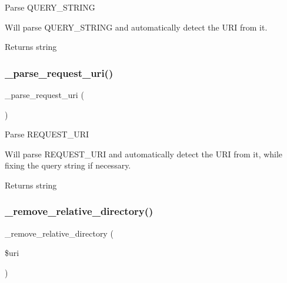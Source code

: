 Parse Q\+U\+E\+R\+Y\+\_\+\+S\+T\+R\+I\+NG

Will parse Q\+U\+E\+R\+Y\+\_\+\+S\+T\+R\+I\+NG and automatically detect the U\+RI from it.

\begin{DoxyReturn}{Returns}
string 
\end{DoxyReturn}
\mbox{\label{class_c_i___u_r_i_ae2e75a6f6657df51c7b6de926979af29}} 
\subsubsection{\texorpdfstring{\+\_\+parse\+\_\+request\+\_\+uri()}{\_parse\_request\_uri()}}
{\footnotesize\ttfamily \+\_\+parse\+\_\+request\+\_\+uri (\begin{DoxyParamCaption}{ }\end{DoxyParamCaption})\hspace{0.3cm}{\ttfamily [protected]}}

Parse R\+E\+Q\+U\+E\+S\+T\+\_\+\+U\+RI

Will parse R\+E\+Q\+U\+E\+S\+T\+\_\+\+U\+RI and automatically detect the U\+RI from it, while fixing the query string if necessary.

\begin{DoxyReturn}{Returns}
string 
\end{DoxyReturn}
\mbox{\label{class_c_i___u_r_i_a01fdc82a66a1611d3e5d42461c1ad59c}} 
\subsubsection{\texorpdfstring{\+\_\+remove\+\_\+relative\+\_\+directory()}{\_remove\_relative\_directory()}}
{\footnotesize\ttfamily \+\_\+remove\+\_\+relative\+\_\+directory (\begin{DoxyParamCaption}\item[{}]{\$uri }\end{DoxyParamCaption})\hspace{0.3cm}{\ttfamily [protected]}}

